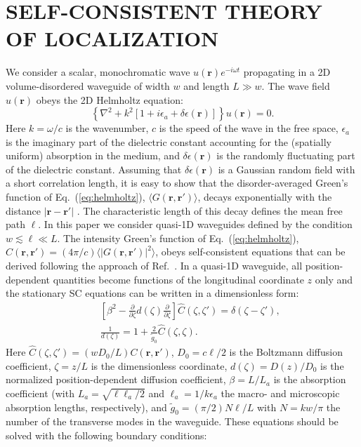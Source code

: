 \section{SELF-CONSISTENT THEORY OF LOCALIZATION}
\label{sec:sctheory}

We consider a scalar, monochromatic wave $u(\mathbf{r})e^{-i \omega t}$ propagating in a 2D volume-disordered waveguide of width $w$ and length $L \gg w$. The wave field $u(\mathbf{r})$ obeys the 2D Helmholtz equation:
\begin{equation}
\left\{\nabla^2 + k^2\left[1 + i \epsilon_a + \delta\epsilon(\mathbf{r}) \right]\right\} u(\mathbf{r}) = 0.
\label{eq:helmholtz}
\end{equation}
Here $k=\omega/c$ is the wavenumber, $c$ is the speed of the wave in the free space, $\epsilon_a$ is the imaginary part of the dielectric constant accounting for the (spatially uniform) absorption in the medium, and $\delta\epsilon(\mathbf{r})$ is the randomly fluctuating part of the dielectric constant.
Assuming that $\delta\epsilon(\mathbf{r})$ is a Gaussian random field with a short correlation length, it is easy to show that the disorder-averaged Green's function of Eq.~(\ref{eq:helmholtz}), $\langle G(\mathbf{r}, \mathbf{r}') \rangle$, decays exponentially with the distance $|\mathbf{r}-\mathbf{r}'|$
\cite{2007_Akkermans_book}. The characteristic length of this decay defines the mean free path $\ell$. In this paper we consider quasi-1D waveguides defined by the condition $w \lesssim \ell \ll L$. The intensity Green's function of Eq.~(\ref{eq:helmholtz}), $C(\mathbf{r}, \mathbf{r}') = (4\pi/c)
\langle \left| G(\mathbf{r}, \mathbf{r}') \right|^2 \rangle$, obeys self-consistent equations that can be derived following the approach of Ref.~. In a quasi-1D waveguide, all position-dependent quantities become functions of the longitudinal coordinate $z$ only and the stationary SC equations can be written in a dimensionless form:
\begin{eqnarray}
&&\left[\beta^2 - \frac{\partial}{\partial \zeta} d(\zeta)
 \frac{\partial}{\partial \zeta} \right] {\hat C}(\zeta,\zeta')
= \delta(\zeta-\zeta'),
\label{eq:sceq1}
\\
&&\frac{1}{d(\zeta)} =  1+\frac{2}{{\tilde g}_0}
{\hat C}(\zeta,\zeta).
\label{eq:sceq2}
\end{eqnarray}
Here ${\hat C}(\zeta,\zeta') = (w D_0/L)C(\mathbf{r},\mathbf{r}')$,
$D_0 = c\ell/2$ is the Boltzmann diffusion coefficient, $\zeta = z/L$ is the dimensionless coordinate, $d(\zeta) = D(z)/D_0$ is the normalized position-dependent diffusion coefficient, $\beta = L/L_a$ is the absorption coefficient (with $L_a = \sqrt{\ell \ell_a/2}$ and $\ell_a = 1/k\epsilon_a$ the macro- and microscopic absorption lengths, respectively), and ${\tilde g}_0 = (\pi/2)N \ell/L$ with $N = kw/\pi$ the number of the transverse modes in the waveguide. These equations should be solved with the following boundary conditions:
